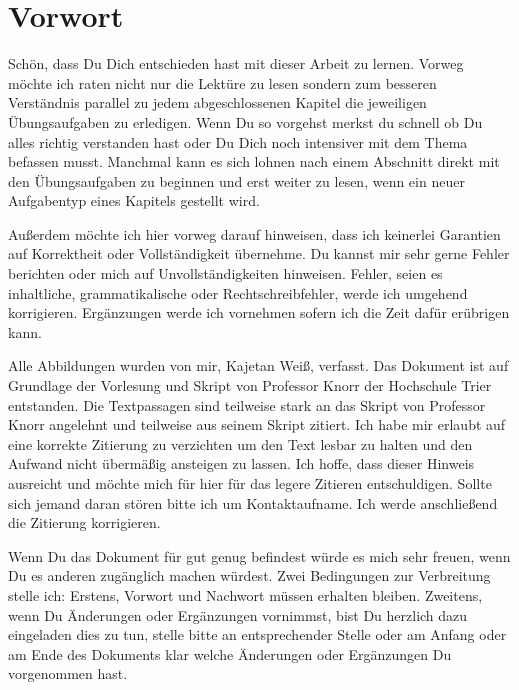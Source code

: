 \chapter*{Vorwort}
Schön, dass Du Dich entschieden hast mit dieser Arbeit zu lernen. Vorweg möchte ich raten nicht nur die Lektüre zu lesen sondern zum besseren Verständnis parallel zu jedem abgeschlossenen Kapitel die jeweiligen Übungsaufgaben zu erledigen. Wenn Du so vorgehst merkst du schnell ob Du alles richtig verstanden hast oder Du Dich noch intensiver mit dem Thema befassen musst. Manchmal kann es sich lohnen nach einem Abschnitt direkt mit den Übungsaufgaben zu beginnen und erst weiter zu lesen, wenn ein neuer Aufgabentyp eines Kapitels gestellt wird.

Außerdem möchte ich hier vorweg darauf hinweisen, dass ich keinerlei Garantien auf Korrektheit oder Vollständigkeit übernehme. Du kannst mir sehr gerne Fehler berichten oder mich auf Unvollständigkeiten hinweisen. Fehler, seien es inhaltliche, grammatikalische oder Rechtschreibfehler, werde ich umgehend korrigieren. Ergänzungen werde ich vornehmen sofern ich die Zeit dafür erübrigen kann.


Alle Abbildungen wurden von mir, Kajetan Weiß, verfasst. Das Dokument ist auf Grundlage der Vorlesung und Skript von Professor Knorr der Hochschule Trier entstanden. Die Textpassagen sind teilweise stark an das Skript von Professor Knorr angelehnt und teilweise aus seinem Skript zitiert. Ich habe mir erlaubt auf eine korrekte Zitierung zu verzichten um den Text lesbar zu halten und den Aufwand nicht übermäßig ansteigen zu lassen. Ich hoffe, dass dieser Hinweis ausreicht und möchte mich für hier für das legere Zitieren entschuldigen. Sollte sich jemand daran stören bitte ich um Kontaktaufname. Ich werde anschließend die Zitierung korrigieren.

Wenn Du das Dokument für gut genug befindest würde es mich sehr freuen, wenn Du es anderen zugänglich machen würdest. Zwei Bedingungen zur Verbreitung stelle ich: Erstens, Vorwort und Nachwort müssen erhalten bleiben. Zweitens, wenn Du Änderungen oder Ergänzungen vornimmst, bist Du herzlich dazu eingeladen dies zu tun, stelle bitte an entsprechender Stelle oder am Anfang oder am Ende des Dokuments klar welche Änderungen oder Ergänzungen Du vorgenommen hast.

